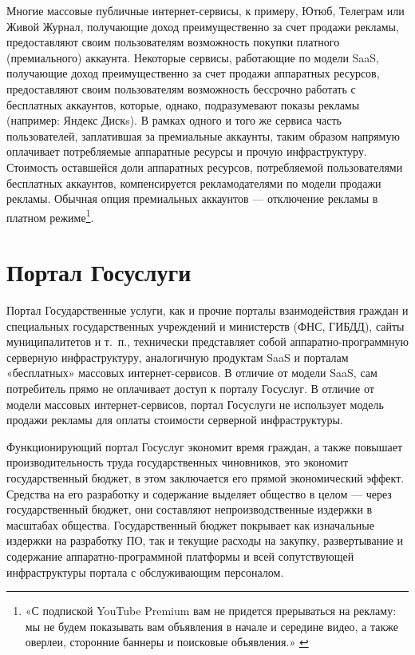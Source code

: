 \documentclass{article}
\begin{document}
Многие массовые публичные интернет-сервисы, к примеру, Ютюб, Телеграм или Живой Журнал, получающие доход преимущественно за счет продажи рекламы, предоставляют своим пользователям возможность покупки платного (премиального) аккаунта. Некоторые сервисы, работающие по модели SaaS, получающие доход преимущественно за счет продажи аппаратных ресурсов, предоставляют своим пользователям возможность бессрочно работать с бесплатных аккаунтов, которые, однако, подразумевают показы рекламы (например: Яндекс Дискs). В рамках одного и того же сервиса часть пользователей, заплатившая за премиальные аккаунты, таким образом напрямую оплачивает потребляемые аппаратные ресурсы и прочую инфраструктуру. Стоимость оставшейся доли аппаратных ресурсов, потребляемой пользователями бесплатных аккаунтов, компенсируется рекламодателями по модели продажи рекламы. Обычная опция премиальных аккаунтов — отключение рекламы в платном режиме\footnote{«С подпиской YouTube Premium вам не придется прерываться на рекламу: мы не будем показывать вам объявления в начале и середине видео, а также оверлеи, сторонние баннеры и поисковые объявления.» \cite{youtubePremium}}.

\section*{Портал Госуслуги}

Портал Государственные услуги, как и прочие порталы взаимодействия граждан и специальных государственных учреждений и министерств (ФНС, ГИБДД), сайты муниципалитетов и т.~п., технически представляет собой аппаратно-программную серверную инфраструктуру, аналогичную продуктам SaaS и порталам «бесплатных» массовых интернет-сервисов. В отличие от модели SaaS, сам потребитель прямо не оплачивает доступ к порталу Госуслуг. В отличие от модели массовых интернет-сервисов, портал Госуслуги не использует модель продажи рекламы для оплаты стоимости серверной инфраструктуры.

Функционирующий портал Госуслуг экономит время граждан, а также повышает производительность труда государственных чиновников, это экономит государственный бюджет, в этом заключается его прямой экономический эффект. Средства на его разработку и содержание выделяет общество в целом — через государственный бюджет, они составляют непроизводственные издержки в масштабах общества. Государственный бюджет покрывает как изначальные издержки на разработку ПО, так и текущие расходы на закупку, развертывание и содержание аппаратно-программной платформы и всей сопутствующей инфраструктуры портала с обслуживающим персоналом.
\end{document}

